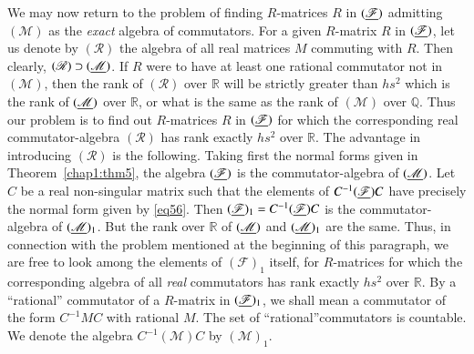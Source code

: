We may now return to the problem of finding $R$-matrices $R$ in\label{p77} 
$(\underline{\mathscr{F}})$ admitting $(\mathscr{M})$ as the {\em exact}
algebra of commutators. For a given $R$-matrix $R$ in
$(\underline{\mathscr{F}})$, let us denote by $(\mathscr{R})$ the algebra of
all real matrices $M$ commuting with $R$. Then clearly,
$(\mathscr{R})\supset (\underline{\mathscr{M}})$. If $R$ were to have at
least one rational commutator not in $(\mathscr{M})$, then the rank of
$(\mathscr{R})$ over $\mathbb{R}$ will be strictly greater than
$hs^{2}$ which is the rank of $(\underline{\mathscr{M}})$ over $\mathbb{R}$,
or what is the same as the rank of $(\mathscr{M})$ over
$\mathbb{Q}$. Thus our problem is to find out $R$-matrices $R$ in
$(\underline{\mathscr{F}})$ for which the corresponding real
commutator-algebra $(\mathscr{R})$ has rank exactly $hs^{2}$ over
$\mathbb{R}$. The advantage in introducing $(\mathscr{R})$ is the
following. Taking first the normal forms given in 
Theorem~\ref{chap1:thm5},
the algebra $(\underline{\mathscr{F}})$ is the commutator-algebra of
$(\underline{\mathscr{M}})$. Let $C$ be a real non-singular matrix such that
the elements of $C^{-1}(\underline{\mathscr{F}})C$ have precisely the normal
form given by \eqref{eq56}. Then
$(\underline{\mathscr{F}})_{1}=C^{-1}(\underline{\mathscr{F}})C$ is the
commutator-algebra of $(\underline{\mathscr{M}})_{1}$. But the rank over
$\mathbb{R}$ of $(\underline{\mathscr{M}})$ and $(\underline{\mathscr{M}})_{1}$ are
the same. Thus, in connection with the problem mentioned at the
beginning of this paragraph, we are free to look among the elements of
$(\mathscr{F})_{1}$ itself, for $R$-matrices for which the
corresponding algebra of all {\em real} commutators has rank exactly
$hs^{2}$ over $\mathbb{R}$. By a ``rational''  commutator of a
$R$-matrix in $(\underline{\mathscr{F}})_{1}$, we shall mean a commutator of
the form $C^{-1}MC$ with rational $M$. The set of
``rational''\pageoriginale commutators is countable. We denote the
algebra $C^{-1}(\mathscr{M})C$ by $(\mathscr{M})_{1}$. 

